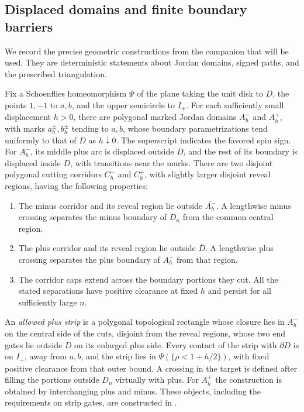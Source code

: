 \subsection{Displaced domains and finite boundary barriers}

We record the precise geometric constructions from the companion that
will be used.  They are deterministic statements about Jordan domains,
signed paths, and the prescribed triangulation.

Fix a Schoenflies homeomorphism $\Psi$ of the plane taking the unit disk
to $D$, the points $1,-1$ to $a,b$, and the upper semicircle to $I_+$.
For each sufficiently small displacement $h>0$, there are polygonal
marked Jordan domains $A_h^-$ and $A_h^+$, with marks
$a_h^\pm,b_h^\pm$ tending to $a,b$,
whose boundary parametrizations tend uniformly to that of $D$ as
$h\downarrow0$.  The superscript indicates the favored spin sign.  For
$A_h^-$, its middle plus arc is displaced outside $D$, and the rest of
its boundary is displaced inside $D$, with transitions near the marks.
There are two disjoint polygonal cutting corridors $C_h^-$ and $C_h^+$,
with slightly larger disjoint reveal regions, having the following
properties:
\begin{enumerate}
 \item The minus corridor and its reveal region lie outside
 $\overline{A_h^-}$.  A lengthwise minus crossing separates the minus
 boundary of $D_n$ from the common central region.
 \item The plus corridor and its reveal region lie outside
 $\overline D$.  A lengthwise plus crossing separates the plus boundary
 of $A_h^-$ from that region.
 \item The corridor caps extend across the boundary portions they cut.
 All the stated separations have positive clearance at fixed $h$ and
 persist for all sufficiently large $n$.
\end{enumerate}
An \emph{allowed plus strip} is a polygonal topological rectangle whose
closure lies in $A_h^-$ on the central side of the cuts, disjoint from the reveal
regions, whose two end gates lie outside $\overline D$ on its enlarged
plus side.  Every contact of the strip with $\partial D$ is on $I_+$,
away from $a,b$, and the strip lies in
$\Psi(\{\rho<1+h/2\})$, with fixed positive clearance from that
outer bound.  A crossing in the target is defined after filling the
portions outside $D_n$ virtually with plus.  For $A_h^+$ the construction
is obtained by interchanging plus and minus.  These objects, including
the requirements on strip gates, are constructed in
\cite[Section~7, ``Fixed displaced domains and their boundary
incidences'']{S}.

